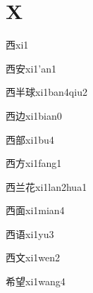 ﻿%
\section*{X}

\begin{verbete}[6]{西}{xi1}
\end{verbete}

\begin{verbete}[6;6]{西安}{xi1'an1}
\end{verbete}

\begin{verbete}[6;5;11]{西半球}{xi1ban4qiu2}
\end{verbete}

\begin{verbete}[6;5]{西边}{xi1bian0}
\end{verbete}

\begin{verbete}[6;10]{西部}{xi1bu4}
\end{verbete}

\begin{verbete}[6;4]{西方}{xi1fang1}
\end{verbete}

\begin{verbete}[6;5;7]{西兰花}{xi1lan2hua1}
\end{verbete}

\begin{verbete}[6;9]{西面}{xi1mian4}
\end{verbete}

\begin{verbete}[6;9]{西语}{xi1yu3}
\end{verbete}

\begin{verbete}[6;4]{西文}{xi1wen2}
\end{verbete}

\begin{verbete}[7;11]{希望}{xi1wang4}
\end{verbete}

